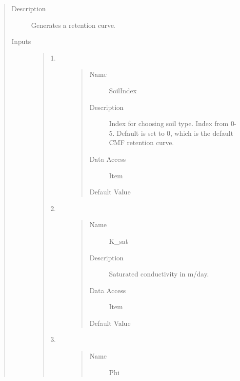 \documentclass[letterpaper,10pt,english]{sphinxmanual}
\begin{document}
\begin{quote}\begin{description}
\item[{Description}] \leavevmode
Generates a retention curve.

\item[{Inputs}] \leavevmode\begin{quote}\begin{description}
\item[{1.}] \leavevmode\begin{quote}\begin{description}
\item[{Name}] \leavevmode
SoilIndex

\item[{Description}] \leavevmode
Index for choosing soil type. Index from 0-5. Default is set to 0, which is the default CMF
retention curve.

\item[{Data Access}] \leavevmode
Item

\item[{Default Value}] \leavevmode
{}

\end{description}\end{quote}

\item[{2.}] \leavevmode\begin{quote}\begin{description}
\item[{Name}] \leavevmode
K\_sat

\item[{Description}] \leavevmode
Saturated conductivity in m/day.

\item[{Data Access}] \leavevmode
Item

\item[{Default Value}] \leavevmode
{}

\end{description}\end{quote}

\item[{3.}] \leavevmode\begin{quote}\begin{description}
\item[{Name}] \leavevmode
Phi


\end{description}
\end{quote}
\end{description}
\end{quote}
\end{description}
\end{quote}
\end{document}
